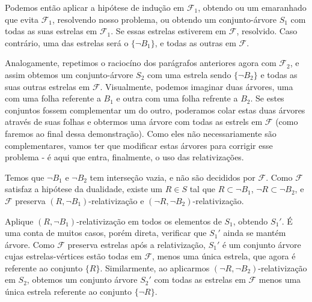 \begin{prova}
    Podemos então aplicar a hipótese de indução em $\mathcal{F}_1$, obtendo ou um emaranhado que evita $\mathcal{F}_1$, resolvendo nosso problema, ou obtendo um conjunto-árvore $S_1$ com todas as suas estrelas em $\mathcal{F}_1$. Se essas estrelas estiverem em $\mathcal{F}$, resolvido. Caso contrário, uma das estrelas será o $\{\lnot{B_1}\}$, e todas as outras em $\mathcal{F}$. 
    
    Analogamente, repetimos o raciocíno dos parágrafos anteriores agora com $\mathcal{F}_2$, e assim obtemos um conjunto-árvore $S_2$ com uma estrela sendo $\{\lnot{B_2}\}$ e todas as suas outras estrelas em $\mathcal{F}$. Visualmente, podemos imaginar duas árvores, uma com uma folha referente a $B_1$ e outra com uma folha refrente a $B_2$. Se estes conjuntos fossem complementar um do outro, poderamos colar estas duas árvores através de suas folhas e obtermos uma árvore com todas as estrels em $\mathcal{F}$ (como faremos ao final dessa demonstração). Como eles não necessariamente são complementares, vamos ter que modificar estas árvores para corrigir esse problema - é aqui que entra, finalmente, o uso das relativizações.

    Temos que $\lnot B_1$ e $\lnot B_2$ tem interseção vazia, e não são decididos por $\mathcal{F}$. Como $\mathcal{F}$ satisfaz a hipótese da dualidade, existe um $R \in S$ tal que $R \subset \lnot B_1$, $\lnot R \subset \lnot B_2$, e $\mathcal{F}$ preserva $(R,\lnot B_1)$-relativização e $(\lnot R, \lnot B_2)$-relativização.

    Aplique $(R,\lnot B_1)$-relativização em todos os elementos de $S_1$, obtendo $S_1'$. É uma conta de muitos casos, porém direta, verificar que $S_1'$ ainda se mantém árvore. Como $\mathcal{F}$ preserva estrelas após a relativização, $S_1'$ é um conjunto árvore cujas estrelas-vértices estão todas em $\mathcal{F}$, menos uma única estrela, que agora é referente ao conjunto $\{R\}$. Similarmente, ao aplicarmos $(\lnot R,\lnot B_2)$-relativização em $S_2$, obtemos um conjunto árvore $S_2'$ com todas as estrelas em $\mathcal{F}$ menos uma única estrela referente ao conjunto $\{\lnot R\}$.


\end{prova}
